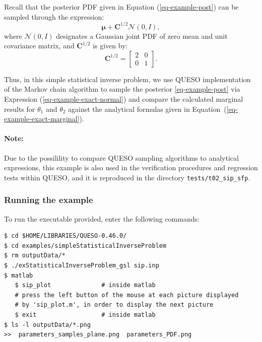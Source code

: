 Recall that the posterior PDF given in 
Equation (\ref{eq-example-post}) can be sampled through the expression:
\begin{equation}\label{eq-example-exact-normal}
\boldsymbol{\mu}+\mathbf{C}^{1/2}\mathcal{N}(0,I),
\end{equation}
where $\mathcal{N}(0,I)$ designates a Gaussian joint PDF of zero mean and unit covariance matrix, and
$\mathbf{C}^{1/2}$ is given by:
\begin{equation*}
\mathbf{C}^{1/2} = 
\left[\begin{array}{cc}
2 & 0 \\
0 & 1
\end{array}\right].
\end{equation*}

Thus, in this simple statistical inverse problem, we use QUESO implementation of the Markov chain 
algorithm to sample the posterior \eqref{eq-example-post} via Expression (\ref{eq-example-exact-normal}) and compare the calculated marginal results for $\theta_1$ and $\theta_2$ 
against the analytical formulas given in Equation~(\ref{eq-example-exact-marginal}). 


\paragraph*{Note:} Due to the possilility to compare QUESO sampling algorithms to analytical expressions, this example is also used in the verification procedures and regression tests within QUESO, and it is reproduced in the directory \verb+tests/t02_sip_sfp+.




\subsubsection{Running the example}\label{sec:example_sip}
 

 To run the executable provided, enter the following commands:
\begin{lstlisting}[label={},caption={}]
$ cd $HOME/LIBRARIES/QUESO-0.46.0/
$ cd examples/simpleStatisticalInverseProblem
$ rm outputData/*
$ ./exStatisticalInverseProblem_gsl sip.inp    
$ matlab
   $ sip_plot	           # inside matlab
   # press the left button of the mouse at each picture displayed 
   # by 'sip_plot.m', in order to display the next picture
   $ exit	               # inside matlab
$ ls -l outputData/*.png
>>  parameters_samples_plane.png  parameters_PDF.png
\end{lstlisting}

